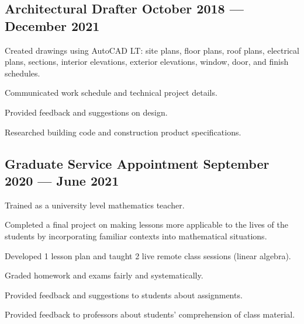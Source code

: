 \documentclass[letter,10pt]{article}
\begin{document}
\subsection{{Architectural Drafter \hfill October 2018 --- December 2021}}
\begin{zitemize}
    \item Created drawings using AutoCAD LT: site plans, floor plans, roof plans, electrical plans, sections, interior elevations, exterior elevations, window, door, and finish schedules.
    \item Communicated work schedule and technical project details.
    \item Provided feedback and suggestions on design.
    \item Researched building code and construction product specifications.
\end{zitemize}

\newpage
\subsection{{Graduate Service Appointment \hfill September 2020 --- June 2021}}
\begin{zitemize}
    \item Trained as a university level mathematics teacher.
    \item Completed a final project on making lessons more applicable to the lives of the students by incorporating familiar contexts into mathematical situations.
    \item Developed 1 lesson plan and taught 2 live remote class sessions (linear algebra).
    \item Graded homework and exams fairly and systematically.
    \item Provided feedback and suggestions to students about assignments.
    \item Provided feedback to professors about students' comprehension of class material.
\end{zitemize}
\end{document}
